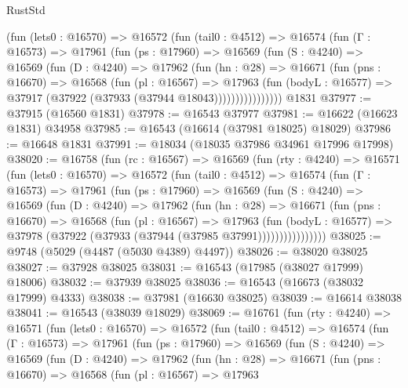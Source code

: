 \begin{lexlean}{RustStd}
\begin{coremodule}
          (fun (lets0 : @16570) =>
          @16572
            (fun (tail0 : @4512) =>
            @16574
              (fun (Γ : @16573) =>
              @17961
                (fun (ps : @17960) =>
                @16569
                  (fun (S : @4240) =>
                  @16569
                    (fun (D : @4240) =>
                    @17962
                      (fun (hn : @28) =>
                      @16671
                        (fun (pns : @16670) =>
                        @16568
                          (fun (pl : @16567) =>
                          @17963
                            (fun (bodyL : @16577) =>
                            @37917 (@37922 (@37933 (@37944 @18043))))))))))))))))
    @1831
@37977 := @37915 (@16560 @1831)
@37978 := @16543 @37977
@37981 := @16622 (@16623 @1831) @34958
@37985 := @16543 (@16614 (@37981 @18025) @18029)
@37986 := @16648 @1831
@37991 := @18034 (@18035 @37986 @34961 @17996 @17998)
@38020 := @16758
    (fun (rc : @16567) =>
    @16569
      (fun (rty : @4240) =>
      @16571
        (fun (lets0 : @16570) =>
        @16572
          (fun (tail0 : @4512) =>
          @16574
            (fun (Γ : @16573) =>
            @17961
              (fun (ps : @17960) =>
              @16569
                (fun (S : @4240) =>
                @16569
                  (fun (D : @4240) =>
                  @17962
                    (fun (hn : @28) =>
                    @16671
                      (fun (pns : @16670) =>
                      @16568
                        (fun (pl : @16567) =>
                        @17963
                          (fun (bodyL : @16577) =>
                          @37978 (@37922 (@37933 (@37944 (@37985 @37991))))))))))))))))
@38025 := @9748 (@5029 (@4487 (@5030 @4389) @4497))
@38026 := @38020 @38025
@38027 := @37928 @38025
@38031 := @16543 (@17985 (@38027 @17999) @18006)
@38032 := @37939 @38025
@38036 := @16543 (@16673 (@38032 @17999) @4333)
@38038 := @37981 (@16630 @38025)
@38039 := @16614 @38038
@38041 := @16543 (@38039 @18029)
@38069 := @16761
    (fun (rty : @4240) =>
    @16571
      (fun (lets0 : @16570) =>
      @16572
        (fun (tail0 : @4512) =>
        @16574
          (fun (Γ : @16573) =>
          @17961
            (fun (ps : @17960) =>
            @16569
              (fun (S : @4240) =>
              @16569
                (fun (D : @4240) =>
                @17962
                  (fun (hn : @28) =>
                  @16671
                    (fun (pns : @16670) =>
                    @16568
                      (fun (pl : @16567) =>
                      @17963

\end{coremodule}
\end{lexlean}
